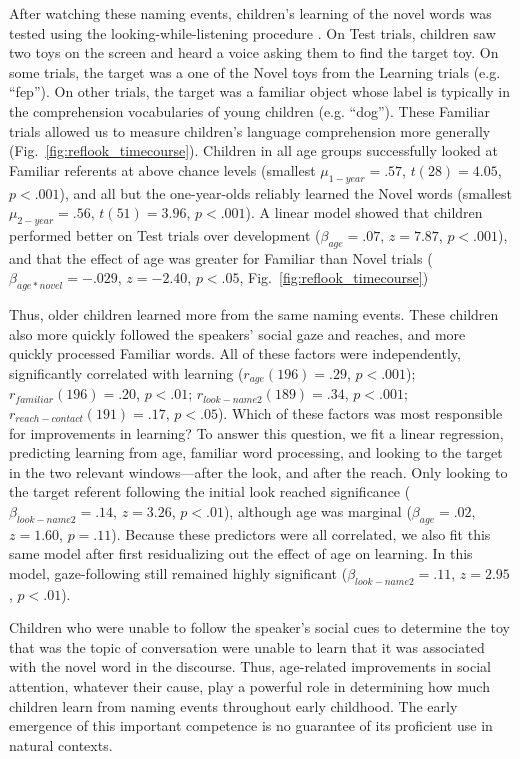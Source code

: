 \documentclass{pnastwo}
\begin{document}
\begin{article}
After watching these naming events, children's learning of the novel words was tested using the looking-while-listening procedure \citep{fernald1998, fernald2008}. On Test trials, children saw two toys on the screen and heard a voice asking them to find the target toy. On some trials, the target was a one of the Novel toys from the Learning trials (e.g. ``fep''). On other trials, the target was a familiar object whose label is typically in the comprehension vocabularies of young children (e.g. ``dog''). These Familiar trials allowed us to measure children's language comprehension more generally (Fig.~\ref{fig:reflook_timecourse}). Children in all age groups successfully looked at Familiar referents at above chance levels (smallest $\mu_{1-year} = .57$, $t(28) = 4.05$, $p < .001$), and all but the one-year-olds reliably learned the Novel words (smallest $\mu_{2-year} = .56$, $t(51) = 3.96$, $p < .001$). A linear model showed that children performed better on Test trials over development ($\beta_{age} = .07$, $z = 7.87$, $p < .001$), and that the effect of age was greater for Familiar than Novel trials ($\beta_{age * novel} = -.029$, $z = -2.40$, $p < .05$, Fig.~\ref{fig:reflook_timecourse})

Thus, older children learned more from the same naming events. These children also more quickly followed the speakers' social gaze and reaches, and more quickly processed Familiar words. All of these factors were independently, significantly correlated with learning ($r_{age}(196) = .29$, $p < .001$); $r_{familiar}(196) = .20$, $p < .01$; $r_{look-name2}(189) = .34$, $p < .001$; $r_{reach-contact}(191) = .17$, $p < .05$). Which of these factors was most responsible for improvements in learning? To answer this question, we fit a linear regression, predicting learning from age, familiar word processing, and looking to the target in the two relevant windows---after the look, and after the reach. Only looking to the target referent following the initial look reached significance ($\beta_{look-name2} = .14$, $z = 3.26$, $p < .01$), although age was marginal ($\beta_{age} = .02$, $z = 1.60$, $p = .11$). Because these predictors were all correlated, we also fit this same model after first residualizing out the effect of age on learning. In this model, gaze-following still remained highly significant ($\beta_{look-name2} = .11$, $z = 2.95$, $p < .01$).

Children who were unable to follow the speaker's social cues to determine the toy that was the topic of conversation were unable to learn that it was associated with the novel word in the discourse. Thus, age-related improvements in social attention, whatever their cause, play a powerful role in determining how much children learn from naming events throughout early childhood. The early emergence of this important competence is no guarantee of its proficient use in natural contexts.


\end{article}
\end{document}
